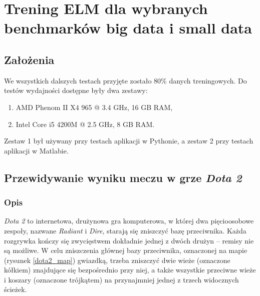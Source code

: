 \documentclass{article}
\begin{document}
\section{Trening ELM dla wybranych benchmarków big data i small data}
\subsection{Założenia}
We wszystkich dalszych testach przyjęte zostało 80\% danych treningowych. Do testów wydajności dostępne były dwa zestawy:
\begin{enumerate}
\item AMD Phenom II X4 965 @ 3.4 GHz, 16 GB RAM,
\item Intel Core i5 4200M @ 2.5 GHz, 8 GB RAM.
\end{enumerate}
Zestaw 1 był używany przy testach aplikacji w Pythonie, a zestaw 2 przy testach aplikacji w Matlabie.
\subsection{Przewidywanie wyniku meczu w grze \textit{Dota 2}}
\subsubsection{Opis}
\textit{Dota 2} to internetowa, drużynowa gra komputerowa, w której dwa pięcioosobowe zespoły, nazwane \textit{Radiant} i \textit{Dire}, starają się zniszczyć bazę przeciwnika. Każda rozgrywka kończy się zwycięstwem dokładnie jednej z dwóch drużyn -- remisy nie są możliwe. W celu zniszczenia głównej bazy przeciwnika, oznaczonej na mapie (rysunek \ref{dota2_map}) gwiazdką, trzeba zniszczyć dwie wieże (oznaczone kółkiem) znajdujące się bezpośrednio przy niej, a także wszystkie przeciwne wieże i koszary (oznaczone trójkątem) na przynajmniej jednej z trzech widocznych ścieżek.
\end{document}

